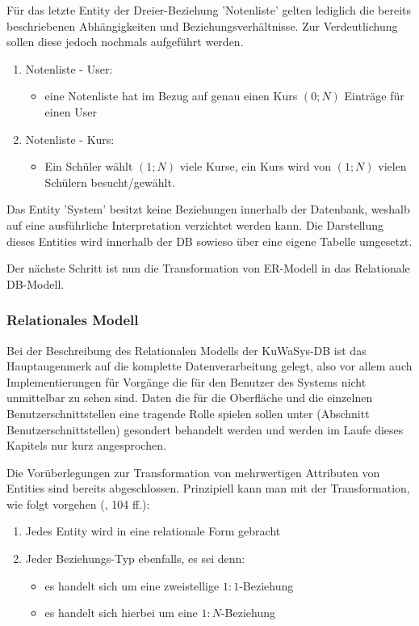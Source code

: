 Für das letzte Entity der Dreier-Beziehung 'Notenliste' gelten lediglich die bereits beschriebenen Abhängigkeiten und Beziehungsverhältnisse. 
Zur Verdeutlichung sollen diese jedoch nochmals aufgeführt werden.

\begin{enumerate}
  \item Notenliste - User:
  \begin{itemize}
    \item eine Notenliste hat im Bezug auf genau einen Kurs $(0;N)$ Einträge für einen User
  \end{itemize}
  
  \item Notenliste - Kurs:
  \begin{itemize}
    \item Ein Schüler wählt $(1;N)$ viele Kurse, ein Kurs wird von $(1;N)$ vielen Schülern besucht/gewählt.
  \end{itemize}
  
\end{enumerate}

Das Entity 'System' besitzt keine Beziehungen innerhalb der Datenbank, weshalb auf eine ausführliche Interpretation verzichtet werden kann.
Die Darstellung dieses Entities wird innerhalb der \ac{DB} sowieso über eine eigene Tabelle umgesetzt.

Der nächste Schritt ist nun die Transformation von \ac{ER-Modell} in das Relationale \ac{DB}-Modell.

\subsubsection{Relationales Modell}\label{subsec:RelModell}

Bei der Beschreibung des Relationalen Modells der KuWaSys-\ac{DB} ist das Hauptaugenmerk auf die komplette Datenverarbeitung gelegt, also vor allem auch Implementierungen für Vorgänge die für den Benutzer des Systems nicht unmittelbar zu sehen sind.
Daten die für die Oberfläche und die einzelnen Benutzerschnittstellen eine tragende Rolle spielen sollen unter (Abschnitt Benutzerschnittstellen) gesondert behandelt werden und werden im Laufe dieses Kapitels nur kurz angesprochen.

Die Vorüberlegungen zur Transformation von mehrwertigen Attributen von Entities sind bereits abgeschlossen.
Prinzipiell kann man mit der Transformation, wie folgt vorgehen (\cite{VossenG-DDD}, 104 ff.):

\begin{enumerate}
 \item Jedes Entity wird in eine relationale Form gebracht
 \item Jeder Beziehungs-Typ ebenfalls, es sei denn:
 \begin{itemize}
  \item es handelt sich um eine zweistellige $1:1$-Beziehung
  \item es handelt sich hierbei um eine $1:N$-Beziehung
 \end{itemize}
\end{enumerate}

